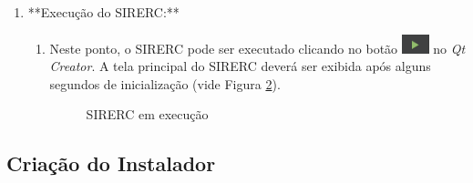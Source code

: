 \documentclass[a4paper,11pt]{article}
\newcommand{\sistema}{\textsf{SIRERC}}
\newcommand{\build}{\textit{build}}
\newcommand{\qtcreator}{\textit{Qt Creator}}
\begin{document}
\begin{enumerate}
\begin{enumerate}
		\begin{figure}[H]\centering
			\caption{Mudança de \build{} para \emph{Release} no \qtcreator{}}\label{fig:qtcreatorrelease}
		\end{figure}
	\end{enumerate}
	
	\item **Execução do \sistema{}:**
	\begin{enumerate}
		\item Neste ponto, o \sistema{} pode ser executado clicando no botão \includegraphics[height=1.5em]{images/sirercrun.png} no \qtcreator{}. A tela principal do \sistema{} deverá ser exibida após alguns segundos de inicialização (vide Figura \ref{fig:sirerc}).
		
		\begin{figure}[H]\centering
			\caption{\sistema{} em execução}\label{fig:sirerc}
		\end{figure}
	\end{enumerate}
\end{enumerate}

\subsection{Criação do Instalador}
\end{document}
